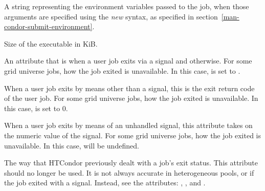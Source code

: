 \begin{description}
\item[\AdAttr{Environment}:]  A string representing the environment variables
passed to the job, when those arguments are specified using the
\emph{new} syntax, as specified in section~\ref{man-condor-submit-environment}.

\item[\AdAttr{ExecutableSize}:]  Size of the executable in KiB.

\item[\AdAttr{ExitBySignal}:]  An attribute that is 
when a user job exits via a signal and  otherwise.
For some grid universe jobs, how the job exited is
unavailable. In this case,  is set to  .

\item[\AdAttr{ExitCode}:]  When a user job exits by means other than a signal,
this is the exit return code of the user job.
For some grid universe jobs, how the job exited is
unavailable. In this case,  is set to  0.

\item[\AdAttr{ExitSignal}:]  When a user job exits by means of an unhandled 
signal, this attribute takes on the numeric value of the signal.
For some grid universe jobs, how the job exited is
unavailable. In this case,  will be undefined.


\item[\AdAttr{ExitStatus}:]  The way that HTCondor previously dealt with
a job's exit status.
This attribute should no longer be used.
It is not always accurate in
heterogeneous pools, or if the job exited with a signal.
Instead, see the attributes: ,
, and
.


\end{description}
